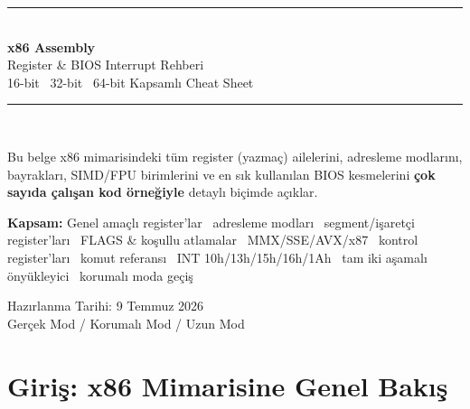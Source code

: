\documentclass[11pt,a4paper]{article}
\begin{document}
\begin{titlepage}
\centering
\vspace*{1.6cm}
{\color{turuncu}\rule{\textwidth}{2pt}}\\[6pt]
{\color{anaMavi}\Huge\bfseries x86 Assembly}\\[10pt]
{\color{vurguMavi}\LARGE Register \& BIOS Interrupt Rehberi}\\[8pt]
{\color{ortaGri}\large 16-bit \textbullet\ 32-bit \textbullet\ 64-bit Kapsamlı Cheat Sheet}\\[6pt]
{\color{turuncu}\rule{\textwidth}{2pt}}\\[1.6cm]

\begin{tcolorbox}[width=0.88\textwidth,colback=acikMavi,colframe=vurguMavi,arc=4pt,boxrule=1pt]
\centering\large
Bu belge x86 mimarisindeki tüm register (yazmaç) ailelerini, adresleme
modlarını, bayrakları, SIMD/FPU birimlerini ve en sık kullanılan BIOS
kesmelerini \textbf{çok sayıda çalışan kod örneğiyle} detaylı biçimde açıklar.
\end{tcolorbox}

\vspace{0.9cm}
\begin{tcolorbox}[width=0.88\textwidth,colback=acikGri,colframe=ortaGri!50,arc=3pt,boxrule=0.6pt]
\small
\textbf{Kapsam:} Genel amaçlı register'lar \textbullet\ adresleme modları \textbullet\
segment/işaretçi register'ları \textbullet\ FLAGS \& koşullu atlamalar \textbullet\
MMX/SSE/AVX/x87 \textbullet\ kontrol register'ları \textbullet\ komut referansı \textbullet\
INT 10h/13h/15h/16h/1Ah \textbullet\ tam iki aşamalı önyükleyici \textbullet\
korumalı moda geçiş
\end{tcolorbox}

\vfill
{\color{ortaGri}\large Hazırlanma Tarihi: 9 Temmuz 2026}\\[4pt]
{\color{ortaGri} Gerçek Mod / Korumalı Mod / Uzun Mod}
\vspace*{0.6cm}
\end{titlepage}

\tableofcontents
\thispagestyle{empty}
\clearpage

\section{Giriş: x86 Mimarisine Genel Bakış}
\end{document}
